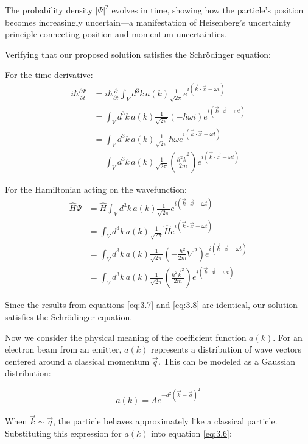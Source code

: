 \documentclass[italian]{HKNdocument}
\begin{document}
The probability density $|\Psi|^2$ evolves in time, showing how the particle's position becomes increasingly uncertain—a manifestation of Heisenberg's uncertainty principle connecting position and momentum uncertainties.


Verifying that our proposed solution satisfies the Schrödinger equation:

For the time derivative:
\begin{align}
i\hbar\frac{\partial\Psi}{\partial t} &= i\hbar\frac{\partial}{\partial t}\int_V d^3k\,a(k)\frac{1}{\sqrt{2\pi}}e^{i(\vec{k}\cdot\vec{x}-\omega t)} \\
&= \int_V d^3k\,a(k)\frac{1}{\sqrt{2\pi}}(-\hbar\omega i)e^{i(\vec{k}\cdot\vec{x}-\omega t)} \\
&= \int_V d^3k\,a(k)\frac{1}{\sqrt{2\pi}}\hbar\omega e^{i(\vec{k}\cdot\vec{x}-\omega t)} \label{eq:3.7} \\
&= \int_V d^3k\,a(k)\frac{1}{\sqrt{2\pi}}\left(\frac{\hbar^2\vec{k}^2}{2m}\right)e^{i(\vec{k}\cdot\vec{x}-\omega t)}
\end{align}

For the Hamiltonian acting on the wavefunction:
\begin{align}
\hat{H}\Psi &= \hat{H}\int_V d^3k\,a(k)\frac{1}{\sqrt{2\pi}}e^{i(\vec{k}\cdot\vec{x}-\omega t)} \\
&= \int_V d^3k\,a(k)\frac{1}{\sqrt{2\pi}}\hat{H}e^{i(\vec{k}\cdot\vec{x}-\omega t)} \\
&= \int_V d^3k\,a(k)\frac{1}{\sqrt{2\pi}}\left(-\frac{\hbar^2}{2m}\nabla^2\right)e^{i(\vec{k}\cdot\vec{x}-\omega t)} \label{eq:3.8} \\
&= \int_V d^3k\,a(k)\frac{1}{\sqrt{2\pi}}\left(\frac{\hbar^2\vec{k}^2}{2m}\right)e^{i(\vec{k}\cdot\vec{x}-\omega t)}
\end{align}

Since the results from equations \eqref{eq:3.7} and \eqref{eq:3.8} are identical, our solution satisfies the Schrödinger equation.

Now we consider the physical meaning of the coefficient function $a(k)$. For an electron beam from an emitter, $a(k)$ represents a distribution of wave vectors centered around a classical momentum $\vec{q}$. This can be modeled as a Gaussian distribution:

\begin{equation}
a(k) = Ae^{-d^2(\vec{k}-\vec{q})^2}
\end{equation}

When $\vec{k} \sim \vec{q}$, the particle behaves approximately like a classical particle. Substituting this expression for $a(k)$ into equation \eqref{eq:3.6}:
\end{document}
